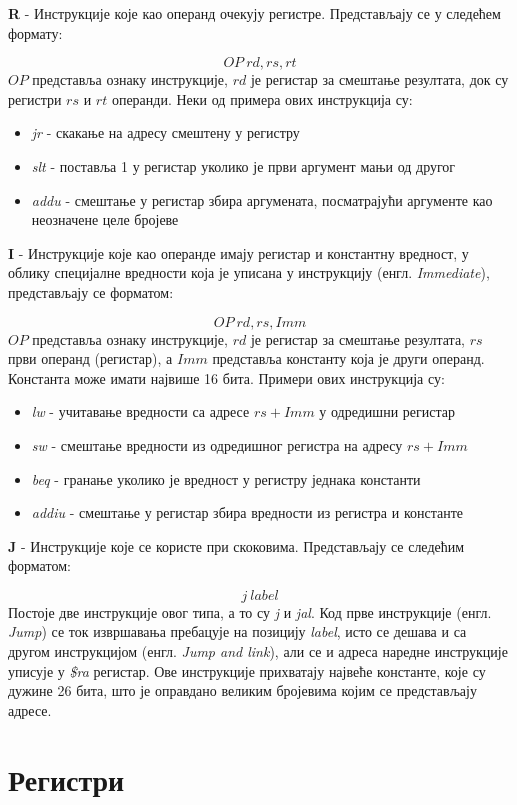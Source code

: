 \documentclass[12pt,oneside]{memoir}
\begin{document}
\textbf{R} - Инструкције које као операнд очекују регистре. Представљају се у следећем формату:

$$
OP\ rd, rs, rt
$$
$OP$ представља ознаку инструкције, $rd$ је регистар за смештање резултата, док су регистри $rs$ и $rt$ операнди.
Неки од примера ових инструкција су:
\begin{itemize}
	\item \textit{jr} - скакање на адресу смештену у регистру
	\item \textit{slt} - поставља 1 у регистар уколико је први аргумент мањи од другог
	\item \textit{addu} - смештање у регистар збира аргумената, посматрајући аргументе као неозначене целе бројеве
\end{itemize}

\textbf{I} - Инструкције које као операнде имају регистар и константну вредност, у облику специјалне вредности која
је уписана у инструкцију (енгл. \textit{Immediate}), представљају се форматом:

$$
OP\ rd, rs, Imm
$$
$OP$ представља ознаку инструкције, $rd$ је регистар за смештање резултата, $rs$ први операнд (регистар), а $Imm$
представља константу која је други операнд. Константа може имати највише 16 бита. Примери ових инструкција су:
\begin{itemize}
	\item \textit{lw} - учитавање вредности са адресе $rs+Imm$ у одредишни регистар
	\item \textit{sw} - смештање вредности из одредишног регистра на адресу $rs+Imm$
	\item \textit{beq} - гранање уколико је вредност у регистру једнака константи
	\item \textit{addiu} - смештање у регистар збира вредности из регистра и константе
\end{itemize}

\textbf{J} - Инструкције које се користе при скоковима. Представљају се следећим форматом:

$$
j\ label
$$
Постоје две инструкције овог типа, а то су \textit{j} и \textit{jal}. Код прве инструкције (енгл. \textit{Jump}) се
ток извршавања пребацује на позицију \textit{label}, исто се дешава и са другом инструкцијом (енгл. \textit{Jump and
link}), али се и адреса наредне инструкције уписује у \textit{\$ra} регистар. Ове инструкције прихватају највеће
константе, које су дужине 26 бита, што је оправдано великим бројевима којим се представљају адресе.

\section{Регистри} \label{chp:REG}
\end{document}
